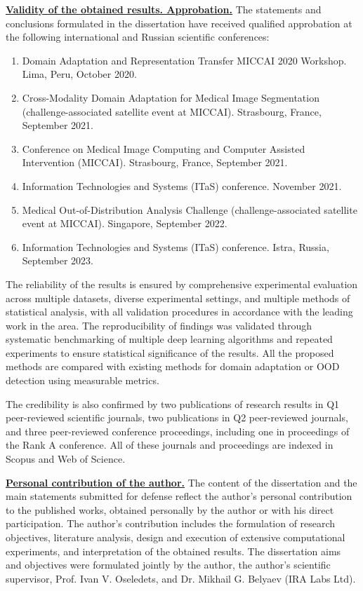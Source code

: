 \underline{\textbf{Validity of the obtained results. Approbation.}} The statements and conclusions formulated in the dissertation have received qualified approbation at the following international and Russian scientific conferences:

\begin{enumerate}
	\item Domain Adaptation and Representation Transfer MICCAI 2020 Workshop. Lima, Peru, October 2020.
	\item Cross-Modality Domain Adaptation for Medical Image Segmentation (challenge-associated satellite event at MICCAI). Strasbourg, France, September 2021.
	\item Conference on Medical Image Computing and Computer Assisted Intervention (MICCAI). Strasbourg, France, September 2021.
	\item Information Technologies and Systems (ITaS) conference. November 2021.
	\item Medical Out-of-Distribution Analysis Challenge (challenge-associated satellite event at MICCAI). Singapore, September 2022.
	\item Information Technologies and Systems (ITaS) conference. Istra, Russia, September 2023.
\end{enumerate}

The reliability of the results is ensured by comprehensive experimental evaluation across multiple datasets, diverse experimental settings, and multiple methods of statistical analysis, with all validation procedures in accordance with the leading work in the area. The reproducibility of findings was validated through systematic benchmarking of multiple deep learning algorithms and repeated experiments to ensure statistical significance of the results. All the proposed methods are compared with existing methods for domain adaptation or OOD detection using measurable metrics.

The credibility is also confirmed by two publications of research results in Q1 peer-reviewed scientific journals, two publications in Q2 peer-reviewed journals, and three peer-reviewed conference proceedings, including one in proceedings of the Rank A conference. All of these journals and proceedings are indexed in Scopus and Web of Science.


\underline{\textbf{Personal contribution of the author.}}
The content of the dissertation and the main statements submitted for defense reflect the author’s personal contribution to the published works, obtained personally by the author or with his direct participation. The author’s contribution includes the formulation of research objectives, literature analysis, design and execution of extensive computational experiments, and interpretation of the obtained results. The dissertation aims and objectives were formulated jointly by the author, the author’s scientific supervisor, Prof. Ivan V. Oseledets, and Dr. Mikhail G. Belyaev (IRA Labs Ltd).

